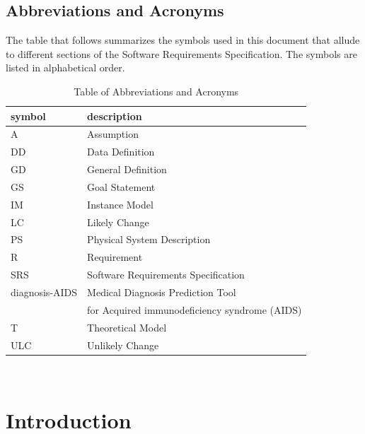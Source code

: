 \documentclass[12pt]{article}
\begin{document}
\subsection{Abbreviations and Acronyms}

The table that follows summarizes the symbols used in this document that allude 
to different sections of the Software Requirements Specification. The symbols 
are listed in alphabetical order.
\begin{table}[ht]
\begin{center}
\renewcommand{\arraystretch}{1.2}
\begin{tabular}{l l} 
  \toprule		
  \textbf{symbol} & \textbf{description}\\
  \midrule 
  A & Assumption\\
  DD & Data Definition\\
  GD & General Definition\\
  GS & Goal Statement\\
  IM & Instance Model\\
  LC & Likely Change\\
  PS & Physical System Description\\
  R & Requirement\\
  SRS & Software Requirements Specification\\
  diagnosis-AIDS & Medical Diagnosis Prediction Tool \\
   & for Acquired immunodeficiency syndrome (AIDS)\\
  T & Theoretical Model\\
  ULC & Unlikely Change\\
  \bottomrule
\end{tabular}\\
\end{center}
\caption{Table of Abbreviations and Acronyms}

\end{table}

\newpage



\section{Introduction}
\end{document}
